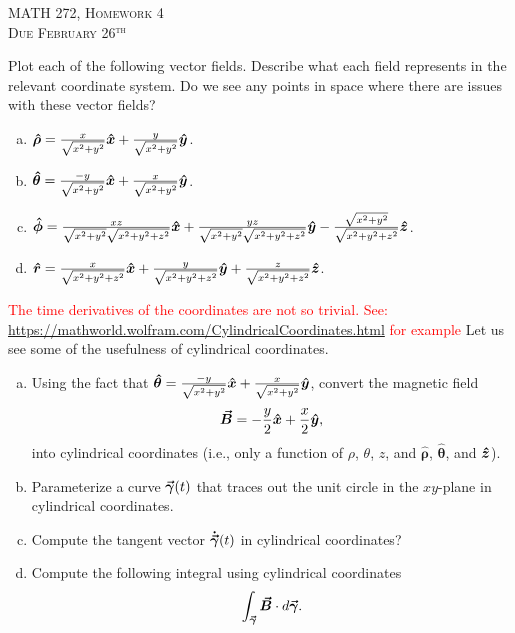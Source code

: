 \documentclass[12pt]{article} %
\newcommand{\grad}{\boldsymbol{\vec{\nabla}}}
\newcommand{\vecfieldB}{\boldsymbol{\vec{B}}}
\newcommand{\rhat}{\boldsymbol{\hat{r}}}
\newcommand{\thetahat}{\boldsymbol{\hat{\theta}}}
\newcommand{\phihat}{\boldsymbol{\hat{\phi}}}
\newcommand{\rhohat}{\boldsymbol{\hat{\rho}}}
\begin{document}
\begin{center}
   \textsc{\large MATH 272, Homework 4}\\
   \textsc{Due February 26$^\textrm{th}$}
\end{center}
\vspace{.5cm}

\begin{problem}
    Plot each of the following vector fields. Describe what each field represents in the relevant coordinate system. Do we see any points in space where there are issues with these vector fields?
    \begin{enumerate}[(a)]
        \item $\rhohat = \frac{x}{\sqrt{x^2+y^2}}\xhat + \frac{y}{\sqrt{x^2+y^2}}\yhat$.
        \item $\thetahat = \frac{-y}{\sqrt{x^2+y^2}}\xhat + \frac{x}{\sqrt{x^2+y^2}}\yhat$.
        \item $\phihat = \frac{xz}{\sqrt{x^2+y^2}\sqrt{x^2+y^2+z^2}}\xhat + \frac{yz}{\sqrt{x^2+y^2}\sqrt{x^2+y^2+z^2}}\yhat-\frac{\sqrt{x^2+y^2}}{\sqrt{x^2+y^2+z^2}}\zhat$.
        \item $\rhat = \frac{x}{\sqrt{x^2+y^2+z^2}}\xhat + \frac{y}{\sqrt{x^2+y^2+z^2}}\yhat+\frac{z}{\sqrt{x^2+y^2+z^2}}\zhat$.
    \end{enumerate}
\end{problem}

\vspace*{.5cm}

\begin{problem}
\textcolor{red}{The time derivatives of the coordinates are not so trivial. See: \url{https://mathworld.wolfram.com/CylindricalCoordinates.html} for example}
Let us see some of the usefulness of cylindrical coordinates.
\begin{enumerate}[(a)]
    \item Using the fact that $\thetahat = \frac{-y}{\sqrt{x^2+y^2}}\xhat + \frac{x}{\sqrt{x^2+y^2}}\yhat$, convert the magnetic field 
    \[
    \vecfieldB = -\frac{y}{2}\xhat + \frac{x}{2}\yhat,
    \]
    into cylindrical coordinates (i.e., only a function of $\rho$, $\theta$, $z$, and $\rhohat$, $\thetahat$, and $\boldsymbol{\hat{z}}$).  
        \item Parameterize a curve $\boldsymbol{\vec{\gamma}}(t)$ that traces out the unit circle in the $xy$-plane in cylindrical coordinates.
        \item Compute the tangent vector $\boldsymbol{\dot{\vec{\gamma}}}(t)$ in cylindrical coordinates?
        \item Compute the following integral using cylindrical coordinates
        \[
        \int_{\curvegamma} \vecfieldB \cdot d\curvegamma.
        \]
\end{enumerate}
\end{problem}
\end{document}
